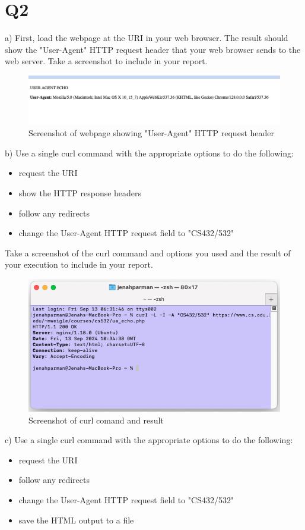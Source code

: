 \documentclass[12pt]{article}
\begin{document}
\section*{Q2}

a) First, load the webpage at the URI in your web browser. The result should show the "User-Agent" HTTP request header that your web browser sends to the web server. Take a screenshot to include in your report.

\begin{figure}[!ht]
    \centering
    \includegraphics[width=0.5\linewidth]{q2_1.png}
    \caption{Screenshot of webpage showing "User-Agent" HTTP request header}
    \label{fig:q2_1}
\end{figure}


b) Use a single curl command with the appropriate options to do the following:

\begin{itemize}
    \item request the URI
    \item show the HTTP response headers
    \item follow any redirects
    \item change the User-Agent HTTP request field to "CS432/532"
\end{itemize}

Take a screenshot of the curl command and options you used and the result of your execution to include in your report.

\begin{figure}[!ht]
    \centering
    \includegraphics[width=0.5\linewidth]{q2_2.png}
    \caption{Screenshot of curl comand and result}
    \label{fig:q2_2}
\end{figure}


c) Use a single curl command with the appropriate options to do the following:

\begin{itemize}
    \item request the URI
    \item follow any redirects
    \item change the User-Agent HTTP request field to "CS432/532"
    \item save the HTML output to a file
\end{itemize}
\end{document}
